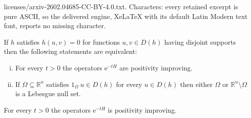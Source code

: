 \documentclass[10pt,a4paper]{amsart}
\def\R{\mathbb{R}}
\begin{document}
licenses/arxiv-2602.04685-CC-BY-4.0.txt. Characters: every retained excerpt is pure ASCII, so the delivered engine, XeLaTeX with its default Latin Modern text font, reports no missing character.
\begin{lem}\label{CharacterizationIrreducibilty}
If $h$ satisfies $h(u, v) = 0$ for functions $u, v \in D(h)$ having disjoint 
supports then the following statements are equivalent:
 \begin{enumerate}[i.)]
\item For every $t>0$ the operators $\mathrm{e}^{-tH}$ are positivity improving.
\item If $\Omega \subseteq \R^{n}$ satisfies $1_{\Omega} \ u \in D(h)$ for every 
$u \in D(h)$ then either $\Omega$ or $\R^{n} \setminus \Omega$ is a Lebesgue null set.\\
\end{enumerate} 
\end{lem} 

\begin{thm}
For every $t>0$ the operators $\mathrm{e}^{-tH}$ is positivity improving.\\
\end{thm}
\end{document}
